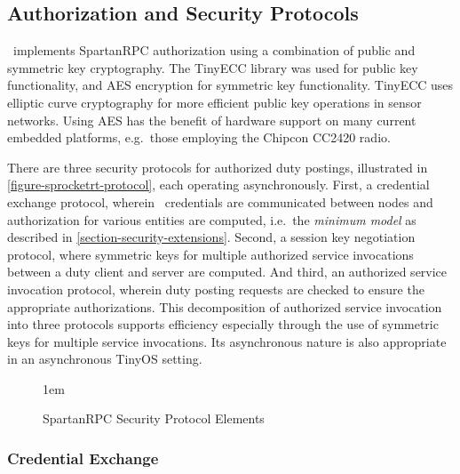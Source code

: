 \subsection{Authorization and Security Protocols}
\label{section-security-protocols}
\label{section-underlying-protocols}

\Sprocket\ implements SpartanRPC authorization using a combination of public and symmetric key
cryptography. The TinyECC library \cite{Liu-Peng-TinyECC-2008} was used for public key
functionality, and AES encryption for symmetric key functionality. TinyECC uses elliptic curve
cryptography for more efficient public key operations in sensor networks. Using AES has the
benefit of hardware support on many current embedded platforms, e.g.~those employing the Chipcon
CC2420 radio.

There are three security protocols for authorized duty postings, illustrated in
\autoref{figure-sprocketrt-protocol}, each operating asynchronously. First, a credential
exchange protocol, wherein \RT\ credentials are communicated between nodes and authorization for
various entities are computed, i.e.~the \emph{minimum model} as described in
\autoref{section-security-extensions}. Second, a session key negotiation protocol, where
symmetric keys for multiple authorized service invocations between a duty client and server are
computed. And third, an authorized service invocation protocol, wherein duty posting requests
are checked to ensure the appropriate authorizations. This decomposition of authorized service
invocation into three protocols supports efficiency especially through the use of symmetric keys
for multiple service invocations. Its asynchronous nature is also appropriate in an asynchronous
TinyOS setting.

\begin{figure}[t]
  
  \centerline{\raise 1em\box\graph}
  \vspace{2mm}
  \caption{SpartanRPC Security Protocol Elements}
  \label{figure-sprocketrt-protocol}
\end{figure}

\subsubsection{Credential Exchange}
\label{section-certificate-format}

